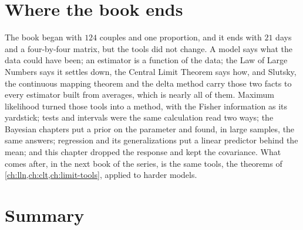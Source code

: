 \section{Where the book ends}
\label{sec:pca-end}

The book began with $124$ couples and one proportion, and it ends with $21$ days and a four-by-four matrix, but the tools did not change.
A model says what the data could have been; an estimator is a function of the data; the Law of Large Numbers says it settles down, the Central Limit Theorem says how, and Slutsky, the continuous mapping theorem and the delta method carry those two facts to every estimator built from averages, which is nearly all of them.
Maximum likelihood turned those tools into a method, with the Fisher information as its yardstick; tests and intervals were the same calculation read two ways; the Bayesian chapters put a prior on the parameter and found, in large samples, the same answers; regression and its generalizations put a linear predictor behind the mean; and this chapter dropped the response and kept the covariance.
What comes after, in the next book of the series, is the same tools, the theorems of \cref{ch:lln,ch:clt,ch:limit-tools}, applied to harder models.

\section{Summary}
\label{sec:pca-summary}

